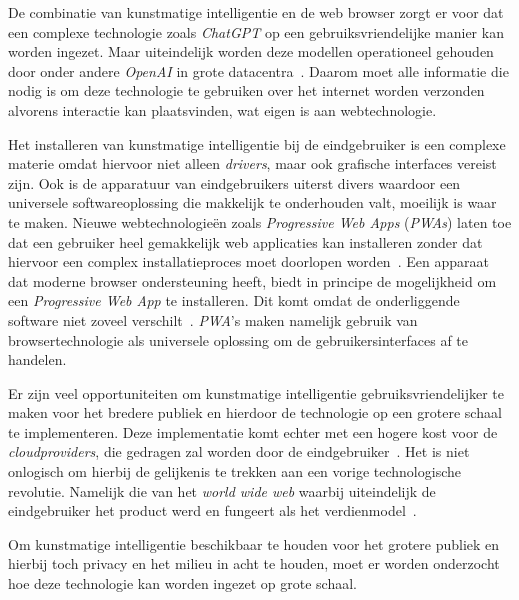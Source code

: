 \bigbreak{}

De combinatie van kunstmatige intelligentie en de web browser zorgt er voor dat een complexe technologie zoals \textit{ChatGPT} op een gebruiksvriendelijke manier kan worden ingezet. Maar uiteindelijk worden deze modellen operationeel gehouden door onder andere \textit{OpenAI} in grote datacentra~\autocite{Warren2023}. Daarom moet alle informatie die nodig is om deze technologie te gebruiken over het internet worden verzonden alvorens interactie kan plaatsvinden, wat eigen is aan webtechnologie.

\bigbreak{}

Het installeren van kunstmatige intelligentie bij de eindgebruiker is een complexe materie omdat hiervoor niet alleen \textit{drivers}, maar ook grafische interfaces vereist zijn. Ook is de apparatuur van eindgebruikers uiterst divers waardoor een universele softwareoplossing die makkelijk te onderhouden valt, moeilijk is waar te maken. Nieuwe webtechnologieën zoals \textit{Progressive Web Apps} (\textit{PWAs}) laten toe dat een gebruiker heel gemakkelijk web applicaties kan installeren zonder dat hiervoor een complex installatieproces moet doorlopen worden~\autocite{Pekala2023}. Een apparaat dat moderne browser ondersteuning heeft, biedt in principe de mogelijkheid om een \textit{Progressive Web App} te installeren. Dit komt omdat de onderliggende software niet zoveel verschilt~\autocite{Todavchich2019}. \textit{PWA}'s maken namelijk gebruik van  browsertechnologie als universele oplossing om de gebruikersinterfaces af te handelen.

\bigbreak{}

Er zijn veel opportuniteiten om kunstmatige intelligentie gebruiksvriendelijker te maken voor het bredere publiek en hierdoor de technologie op een grotere schaal te implementeren. Deze implementatie komt echter met een hogere kost voor de \textit{cloudproviders}, die gedragen zal worden door de eind\-ge\-brui\-ker~\autocite{Khan2024}. Het is niet onlogisch om hierbij de gelijkenis te trekken aan een vorige technologische revolutie. Namelijk die van het \textit{world wide web} waarbij uiteindelijk de eind\-ge\-brui\-ker het product werd en fungeert als het verdienmodel~\autocite{quoteresearch2017, OKO2019}.

\bigbreak{}

Om kunstmatige intelligentie beschikbaar te houden voor het grotere publiek en hierbij toch privacy en het milieu in acht te houden, moet er worden onderzocht hoe deze technologie kan worden ingezet op grote schaal.

